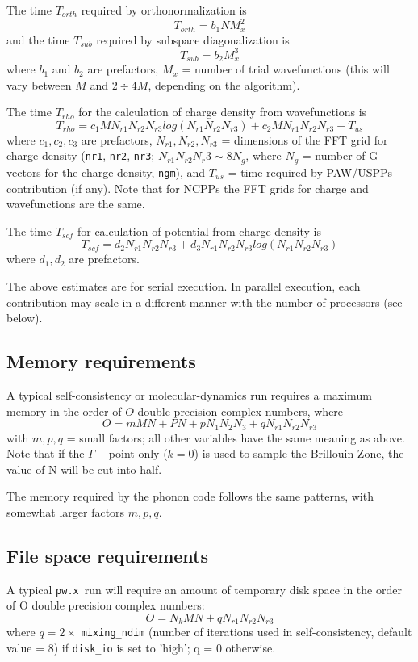 \documentclass[12pt,a4paper]{article}
\def\pwx{\texttt{pw.x}}
\begin{document}
The time $T_{orth}$ required by orthonormalization is
$$T_{orth} = b_1 N M_x^2$$ 
and the time $T_{sub}$ required by subspace diagonalization is
$$T_{sub} = b_2 M_x^3$$
where $b_1$ and $b_2$ are prefactors, $M_x$ = number of trial wavefunctions 
(this will vary between $M$ and $2\div4 M$, depending on the algorithm).
    
The time $T_{rho}$ for the calculation of charge density from wavefunctions is
$$T_{rho} = c_1 M N_{r1} N_{r2}N_{r3} log(N_{r1} N_{r2} N_{r3}) + 
            c_2 M N_{r1} N_{r2} N_{r3} + T_{us}$$
where $c_1, c_2, c_3$ are prefactors, $N_{r1}, N_{r2}, N_{r3}$ =
dimensions of the FFT grid for charge density (\texttt{nr1},
\texttt{nr2}, \texttt{nr3}; $N_{r1} N_{r2} N_r3 \sim 8N_g$,
where $N_g$ = number of G-vectors for the charge density,
\texttt{ngm}), and 
$T_{us}$ = time required by PAW/USPPs contribution (if any).
Note that for NCPPs the FFT grids for charge and
wavefunctions are the same.
 
The time $T_{scf}$ for calculation of potential from charge density is
$$T_{scf} = d_2 N_{r1} N_{r2} N_{r3} + d_3 N_{r1} N_{r2} N_{r3} 
            log(N_{r1} N_{r2} N_{r3} )$$
where $d_1, d_2$ are prefactors.

The above estimates are for serial execution. In parallel execution,
each contribution may scale in a different manner with the number of processors (see below).

\subsection{Memory requirements}

A typical self-consistency or molecular-dynamics run requires a maximum
memory in the order of $O$ double precision complex numbers, where
$$ O = m M N + P N + p N_1 N_2 N_3 + q N_{r1} N_{r2} N_{r3}$$
with $m, p, q$ = small factors; all other variables have the same meaning as
above. Note that if the $\Gamma-$point only ($k=0$) is used to sample the 
Brillouin Zone, the value of N will be cut into half.

The memory required by the phonon code follows the same patterns, with
somewhat larger factors $m, p, q$.

\subsection{File space requirements}

A typical \pwx\ run will require an amount of temporary disk space in the
order of O double precision complex numbers:
$$O = N_k M N + q N_{r1} N_{r2}N_{r3}$$
where $q = 2\times$ \texttt{mixing\_ndim} (number of iterations used in 
self-consistency, default value = 8) if \texttt{disk\_io} is set to 'high'; q = 0 
otherwise.
\end{document}

